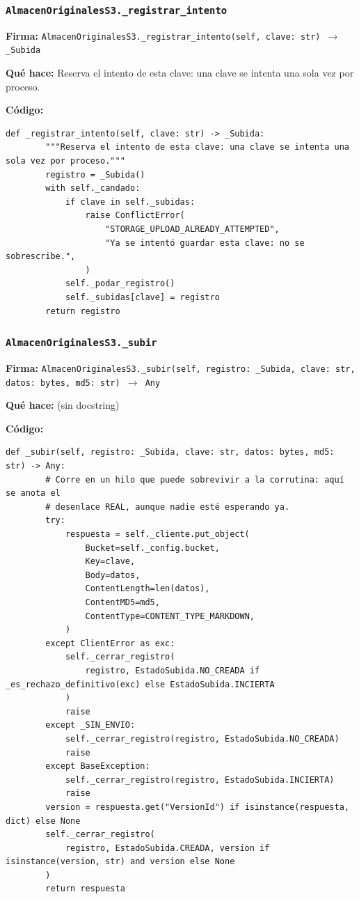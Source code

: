 \documentclass[11pt,a4paper]{article}
\begin{document}
\subsubsection*{\texttt{AlmacenOriginalesS3.\_registrar\_intento}}
\textbf{Firma:} \texttt{AlmacenOriginalesS3.\_registrar\_intento(self, clave: str) $\rightarrow$ \_Subida}

\textbf{Qué hace:} Reserva el intento de esta clave: una clave se intenta una sola vez por proceso.

\textbf{Código:}
\begin{lstlisting}
def _registrar_intento(self, clave: str) -> _Subida:
        """Reserva el intento de esta clave: una clave se intenta una sola vez por proceso."""
        registro = _Subida()
        with self._candado:
            if clave in self._subidas:
                raise ConflictError(
                    "STORAGE_UPLOAD_ALREADY_ATTEMPTED",
                    "Ya se intentó guardar esta clave: no se sobrescribe.",
                )
            self._podar_registro()
            self._subidas[clave] = registro
        return registro
\end{lstlisting}

\subsubsection*{\texttt{AlmacenOriginalesS3.\_subir}}
\textbf{Firma:} \texttt{AlmacenOriginalesS3.\_subir(self, registro: \_Subida, clave: str, datos: bytes, md5: str) $\rightarrow$ Any}

\textbf{Qué hace:} (sin docstring)

\textbf{Código:}
\begin{lstlisting}
def _subir(self, registro: _Subida, clave: str, datos: bytes, md5: str) -> Any:
        # Corre en un hilo que puede sobrevivir a la corrutina: aquí se anota el
        # desenlace REAL, aunque nadie esté esperando ya.
        try:
            respuesta = self._cliente.put_object(
                Bucket=self._config.bucket,
                Key=clave,
                Body=datos,
                ContentLength=len(datos),
                ContentMD5=md5,
                ContentType=CONTENT_TYPE_MARKDOWN,
            )
        except ClientError as exc:
            self._cerrar_registro(
                registro, EstadoSubida.NO_CREADA if _es_rechazo_definitivo(exc) else EstadoSubida.INCIERTA
            )
            raise
        except _SIN_ENVIO:
            self._cerrar_registro(registro, EstadoSubida.NO_CREADA)
            raise
        except BaseException:
            self._cerrar_registro(registro, EstadoSubida.INCIERTA)
            raise
        version = respuesta.get("VersionId") if isinstance(respuesta, dict) else None
        self._cerrar_registro(
            registro, EstadoSubida.CREADA, version if isinstance(version, str) and version else None
        )
        return respuesta
\end{lstlisting}
\end{document}
